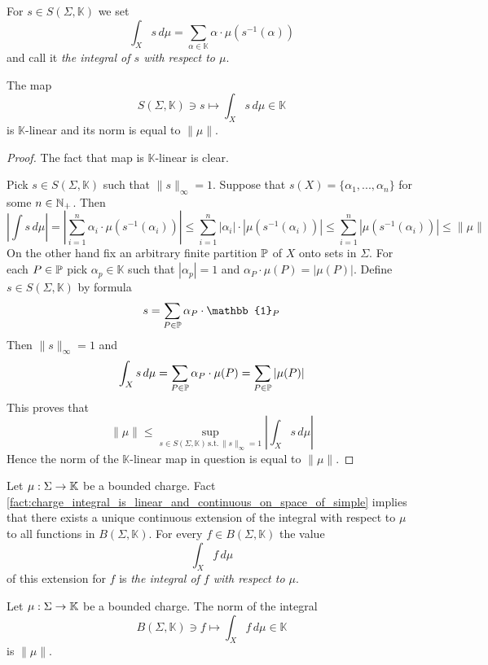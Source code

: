 \begin{definition}
    For $s \in S(\Sigma,\mathbb{K})$ we set
    $$\int_Xs\,d\mu = \sum_{\alpha \in \mathbb{K}}\alpha\cdot \mu\left(s^{-1}(\alpha)\right)$$
    and call it \textit{the integral of $s$ with respect to $\mu$}.
\end{definition}

\begin{fact}\label{fact:charge_integral_is_linear_and_continuous_on_space_of_simple}
    The map
    $$S(\Sigma, \mathbb{K})\ni s \mapsto \int_Xs\,d\mu\in \mathbb{K}$$
    is $\mathbb{K}$-linear and its norm is equal to $\lVert \mu \rVert$.
\end{fact}
\begin{proof}
    The fact that map is $\mathbb{K}$-linear is clear.

    Pick $s \in S(\Sigma,\mathbb{K})$ such that $\lVert s \rVert_{\infty} = 1$. Suppose that $s(X) = \{\alpha_1,...,\alpha_n\}$ for some $n \in {\mathbb N}_+$. Then
    $$\left|\int s\,d\mu\right| = \left|\sum_{i=1}^n\alpha_i\cdot \mu(s^{-1}(\alpha_i))\right| \leq \sum_{i=1}^n|\alpha_i|\cdot |\mu(s^{-1}(\alpha_i))| \leq \sum_{i=1}^n|\mu(s^{-1}(\alpha_i))| \leq \lVert \mu \rVert$$
    On the other hand fix an arbitrary finite partition ${\mathbb P}$ of $X$ onto sets in $\Sigma$. For each $P \in {\mathbb P}$ pick $\alpha_p \in \mathbb{K}$ such that $|\alpha_p| = 1$ and $\alpha_P\cdot \mu(P) = |\mu(P)|$. Define $s \in S(\Sigma,\mathbb{K})$ by formula
    $$s = \sum_{P\in \PP}\alpha_P\cdot \mathbb{1}_{P}$$
    Then $\lVert s \rVert_{\infty} = 1$ and
    $$\int_Xs\,d\mu = \sum_{P \in {\mathbb P}}\alpha_P\cdot \mu(P) = \sum_{P\in {\mathbb P}}|\mu(P)|$$
    This proves that
    $$\lVert \mu \rVert \leq \sup_{s\in S(\Sigma,\mathbb{K})\,\mathrm{s.t.}\,\lVert s \rVert_{\infty}=1}\left|\int_Xs\,d\mu\right|$$
    Hence the norm of the $\mathbb{K}$-linear map in question is equal to $\lVert \mu \rVert$.
\end{proof}

\begin{definition}
    Let $\mu:\Sigma \rightarrow \mathbb{K}$ be a bounded charge. Fact \ref{fact:charge_integral_is_linear_and_continuous_on_space_of_simple} implies that there exists a unique continuous extension of the integral with respect to $\mu$ to all functions in $B(\Sigma, \mathbb{K})$. For every $f \in B(\Sigma,\mathbb{K})$ the value
    $$\int_X f\,d\mu$$
    of this extension for $f$ is \textit{the integral of $f$ with respect to $\mu$}.
\end{definition}

\begin{remark}\label{remark:norm_of_integration_is_total_variation}
    Let $\mu:\Sigma \rightarrow \mathbb{K}$ be a bounded charge. The norm of the integral
    $$B(\Sigma,\mathbb{K})\ni f \mapsto \int_X f\,d\mu\in \mathbb{K}$$
    is $\lVert \mu \rVert$.
\end{remark}

